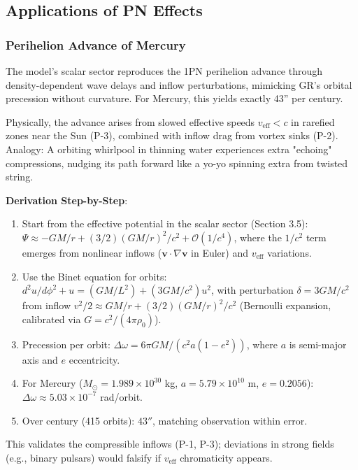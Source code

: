 \documentclass{article}
\begin{document}
\subsection{Applications of PN Effects}

\subsubsection{Perihelion Advance of Mercury}

The model's scalar sector reproduces the 1PN perihelion advance through density-dependent wave delays and inflow perturbations, mimicking GR's orbital precession without curvature. For Mercury, this yields exactly 43'' per century.

Physically, the advance arises from slowed effective speeds $v_{\text{eff}} < c$ in rarefied zones near the Sun (P-3), combined with inflow drag from vortex sinks (P-2). Analogy: A orbiting whirlpool in thinning water experiences extra "echoing" compressions, nudging its path forward like a yo-yo spinning extra from twisted string.

\textbf{Derivation Step-by-Step}:
\begin{enumerate}
    \item Start from the effective potential in the scalar sector (Section 3.5): $\Psi \approx -GM/r + (3/2) (GM/r)^2 / c^2 + \mathcal{O}(1/c^4)$, where the $1/c^2$ term emerges from nonlinear inflows ($\mathbf{v} \cdot \nabla \mathbf{v}$ in Euler) and $v_{\text{eff}}$ variations.
    \item Use the Binet equation for orbits: $d^2 u / d\phi^2 + u = (GM / L^2) + (3 GM / c^2) u^2$, with perturbation $\delta = 3 GM / c^2$ from inflow $v^2 / 2 \approx GM / r + (3/2) (GM / r)^2 / c^2$ (Bernoulli expansion, calibrated via $G = c^2 / (4\pi \rho_0)$).
    \item Precession per orbit: $\Delta\omega = 6\pi GM / (c^2 a (1-e^2))$, where $a$ is semi-major axis and $e$ eccentricity.
    \item For Mercury ($M_\odot = 1.989 \times 10^{30}$ kg, $a = 5.79 \times 10^{10}$ m, $e=0.2056$): $\Delta\omega \approx 5.03 \times 10^{-7}$ rad/orbit.
    \item Over century (415 orbits): $43''$, matching observation within error.
\end{enumerate}

This validates the compressible inflows (P-1, P-3); deviations in strong fields (e.g., binary pulsars) would falsify if $v_{\text{eff}}$ chromaticity appears.
\end{document}
